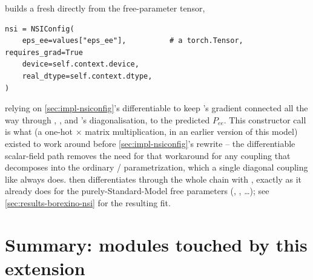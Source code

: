 \begin{implbox}
 builds a fresh
 directly from the free-parameter tensor,
\begin{lstlisting}[style=tpython]
nsi = NSIConfig(
    eps_ee=values["eps_ee"],          # a torch.Tensor, requires_grad=True
    device=self.context.device,
    real_dtype=self.context.dtype,
)
\end{lstlisting}
relying on \cref{sec:impl-nsiconfig}'s differentiable
 to keep 's gradient connected all the
way through , , and
's
 diagonalisation, to the predicted $P_{ee}$. This
constructor call is what  (a one-hot
$\times$  matrix multiplication, in an earlier version of this
model) existed to work around before \cref{sec:impl-nsiconfig}'s rewrite --
the differentiable scalar-field path removes the need for that workaround
for any coupling that decomposes into the ordinary
/ parametrization, which a single diagonal
coupling like  always does.
 then differentiates through the whole
chain with , exactly as it already does for the
purely-Standard-Model free parameters (, ,
\dots); see \cref{sec:results-borexino-nsi} for the resulting fit.
\end{implbox}

\section{Summary: modules touched by this extension}

